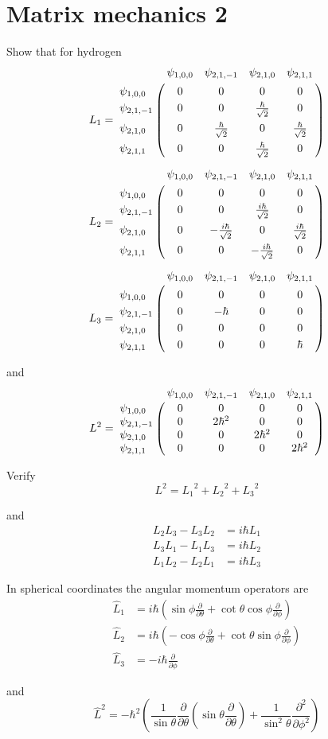 

\section*{Matrix mechanics 2}

Show that for hydrogen
\begin{align*}
L_1&=
\bordermatrix{
& \psi_{1,0,0} & \psi_{2,1,-1} & \psi_{2,1,0} & \psi_{2,1,1} \cr
\psi_{1,0,0} & 0 & 0 & 0 & 0 \cr
\psi_{2,1,-1} & 0 & 0 & \frac{\hbar}{\sqrt2} & 0 \cr
\psi_{2,1,0} & 0 & \frac{\hbar}{\sqrt2} & 0 & \frac{\hbar}{\sqrt2} \cr
\psi_{2,1,1} & 0 & 0 & \frac{\hbar}{\sqrt2} & 0
}
\\[1ex]
L_2&=
\bordermatrix{
& \psi_{1,0,0} & \psi_{2,1,-1} & \psi_{2,1,0} & \psi_{2,1,1} \cr
\psi_{1,0,0} & 0 & 0 & 0 & 0 \cr
\psi_{2,1,-1} & 0 & 0 & \frac{i\hbar}{\sqrt2} & 0 \cr
\psi_{2,1,0} & 0 & -\frac{i\hbar}{\sqrt2} & 0 & \frac{i\hbar}{\sqrt2} \cr
\psi_{2,1,1} & 0 & 0 & -\frac{i\hbar}{\sqrt2} & 0
}
\\[1ex]
L_3&=
\bordermatrix{
& \psi_{1,0,0} & \psi_{2,1,-1} & \psi_{2,1,0} & \psi_{2,1,1} \cr
\psi_{1,0,0} & 0 & 0 & 0 & 0 \cr
\psi_{2,1,-1} & 0 & -\hbar & 0 & 0 \cr
\psi_{2,1,0} & 0 & 0 & 0 & 0 \cr
\psi_{2,1,1} & 0 & 0 & 0 & \hbar
}
\end{align*}

and
\begin{equation*}
L^2=
\bordermatrix{
& \psi_{1,0,0} & \psi_{2,1,-1} & \psi_{2,1,0} & \psi_{2,1,1} \cr
\psi_{1,0,0} & 0 & 0 & 0 & 0 \cr
\psi_{2,1,-1} & 0 & 2\hbar^2 & 0 & 0 \cr
\psi_{2,1,0} & 0 & 0 & 2\hbar^2 & 0 \cr
\psi_{2,1,1} & 0 & 0 & 0 & 2\hbar^2
}
\end{equation*}

Verify
\begin{equation*}
L^2={L_1}^2+{L_2}^2+{L_3}^2
\end{equation*}

and
\begin{align*}
L_2L_3-L_3L_2&=i\hbar L_1
\\
L_3L_1-L_1L_3&=i\hbar L_2
\\
L_1L_2-L_2L_1&=i\hbar L_3
\end{align*}

In spherical coordinates the angular momentum operators are
\begin{align*}
\hat L_1&=i\hbar\left(\sin\phi\frac{\partial}{\partial\theta}
+\cot\theta\cos\phi\frac{\partial}{\partial\phi}\right)
\\
\hat L_2&=i\hbar\left(-\cos\phi\frac{\partial}{\partial\theta}
+\cot\theta\sin\phi\frac{\partial}{\partial\phi}\right)
\\
\hat L_3&=-i\hbar\frac{\partial}{\partial\phi}
\end{align*}

and
\begin{equation*}
\hat L^2=-\hbar^2\left(\frac{1}{\sin\theta}\frac{\partial}{\partial\theta}
\left(\sin\theta\frac{\partial}{\partial\theta}\right)
+\frac{1}{\sin^2\theta}\frac{\partial^2}{\partial\phi^2}\right)
\end{equation*}


